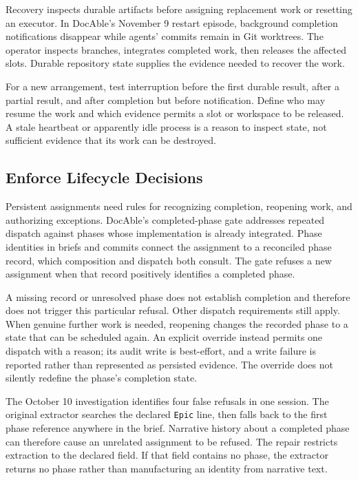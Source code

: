 Recovery inspects durable artifacts before assigning replacement work or resetting an executor. In DocAble's November 9 restart episode, background completion notifications disappear while agents' commits remain in Git worktrees. The operator inspects branches, integrates completed work, then releases the affected slots. Durable repository state supplies the evidence needed to recover the work.

For a new arrangement, test interruption before the first durable result, after a partial result, and after completion but before notification. Define who may resume the work and which evidence permits a slot or workspace to be released. A stale heartbeat or apparently idle process is a reason to inspect state, not sufficient evidence that its work can be destroyed.

\subsection*{Enforce Lifecycle Decisions}

\label{heading:handbook-conversion-episode}

Persistent assignments need rules for recognizing completion, reopening work, and authorizing exceptions. DocAble's completed-phase gate addresses repeated dispatch against phases whose implementation is already integrated. Phase identities in briefs and commits connect the assignment to a reconciled phase record, which composition and dispatch both consult. The gate refuses a new assignment when that record positively identifies a completed phase.

A missing record or unresolved phase does not establish completion and therefore does not trigger this particular refusal. Other dispatch requirements still apply. When genuine further work is needed, reopening changes the recorded phase to a state that can be scheduled again. An explicit override instead permits one dispatch with a reason; its audit write is best-effort, and a write failure is reported rather than represented as persisted evidence. The override does not silently redefine the phase's completion state.

The October 10 investigation identifies four false refusals in one session. The original extractor searches the declared \texttt{Epic} line, then falls back to the first phase reference anywhere in the brief. Narrative history about a completed phase can therefore cause an unrelated assignment to be refused. The repair restricts extraction to the declared field. If that field contains no phase, the extractor returns no phase rather than manufacturing an identity from narrative text.

